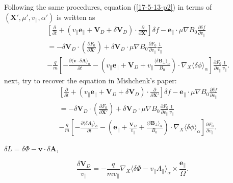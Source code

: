 \documentclass{llncs}
\begin{document}
Following the same procedures, equation (\ref{17-5-13-p2}) in terms of
$(\mathbf{X}', \mu', v_{\parallel}, \alpha')$ is written as
\begin{eqnarray}
  &  & \left[ \frac{\partial}{\partial t} + (v_{\parallel}
  \mathbf{e}_{\parallel} +\mathbf{V}_D + \delta \mathbf{V}_D) \cdot
  \frac{\partial}{\partial \mathbf{X}'} \right] \delta f
  -\mathbf{e}_{\parallel} \cdot \mu \nabla B_0 \frac{\partial \delta
  f}{\partial v_{\parallel}} \nonumber\\
  &  & = - \delta \mathbf{V}_D \cdot \left( \frac{\partial F_0}{\partial
  \mathbf{X}'} \right) + \delta \mathbf{V}_D \cdot \mu \nabla B_0
  \frac{\partial F_0}{\partial v_{\parallel}} \frac{1}{v_{\parallel}}
  \nonumber\\
  &  & - \frac{q}{m} \left[ - \frac{\partial \langle \mathbf{v} \cdot \delta
  \mathbf{A} \rangle_{\alpha}}{\partial t} - \left( v_{\parallel}
  \mathbf{e}_{\parallel} +\mathbf{V}_D + v_{\parallel} \frac{\langle \delta
  \mathbf{B}_{\perp} \rangle_{\alpha}}{B_0} \right) \cdot \nabla_X \langle
  \delta \phi \rangle_{\alpha} \right] \frac{\partial F_0}{\partial
  v_{\parallel}}  \frac{1}{v_{\parallel}} .  \label{17-5-13-p2m}
\end{eqnarray}
next, try to recover the equation in Mishchenk's paper:
\begin{eqnarray*}
  &  & \left[ \frac{\partial}{\partial t} + (v_{\parallel}
  \mathbf{e}_{\parallel} +\mathbf{V}_D + \delta \mathbf{V}_D) \cdot
  \frac{\partial}{\partial \mathbf{X}'} \right] \delta f
  -\mathbf{e}_{\parallel} \cdot \mu \nabla B_0 \frac{\partial \delta
  f}{\partial v_{\parallel}}\\
  &  & = - \delta \mathbf{V}_D \cdot \left( \frac{\partial F_0}{\partial
  \mathbf{X}'} \right) + \delta \mathbf{V}_D \cdot \mu \nabla B_0
  \frac{\partial F_0}{\partial v_{\parallel}} \frac{1}{v_{\parallel}}\\
  &  & - \frac{q}{m} \left[ - \frac{{\partial \langle \delta A_{\parallel}} 
  \rangle_{\alpha}}{\partial t} - \left( \mathbf{e}_{\parallel} +
  \frac{\mathbf{V}_D}{v_{\parallel}} + \frac{\langle \delta \mathbf{B}_{\perp}
  \rangle_{\alpha}}{B_0} \right) \cdot \nabla_X \langle \delta \phi
  \rangle_{\alpha} \right] \frac{\partial F_0}{\partial v_{\parallel}} .\\
  &  & \\
  &  & 
\end{eqnarray*}
$\delta L = \delta \Phi -\mathbf{v} \cdot \delta \mathbf{A}$,


\begin{equation}
  \frac{\delta \mathbf{V}_D}{v_{\parallel}} = - \frac{q}{m v_{\parallel}}
  \nabla_X \langle \delta \Phi - v_{\parallel} A_{\parallel} \rangle_{\alpha}
  \times \frac{\mathbf{e}_{\parallel}}{\Omega} .
\end{equation}
\end{document}
